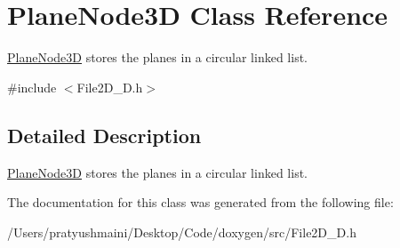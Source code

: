 \hypertarget{class_plane_node3_d}{}\section{Plane\+Node3D Class Reference}
\label{class_plane_node3_d}


\mbox{\hyperlink{class_plane_node3_d}{Plane\+Node3D}} stores the planes in a circular linked list.  




{\ttfamily \#include $<$File2\+D\+\_\+D.\+h$>$}



\subsection{Detailed Description}
\mbox{\hyperlink{class_plane_node3_d}{Plane\+Node3D}} stores the planes in a circular linked list. 

The documentation for this class was generated from the following file\+:\begin{DoxyCompactItemize}
\item 
/\+Users/pratyushmaini/\+Desktop/\+Code/doxygen/src/File2\+D\+\_\+D.\+h\end{DoxyCompactItemize}
